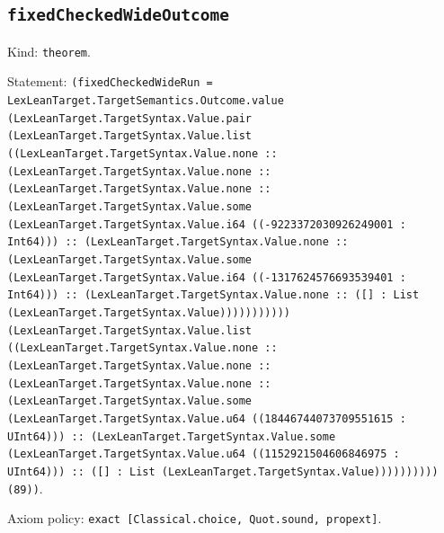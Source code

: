 \documentclass[11pt]{article}
\begin{document}
\subsection*{\texttt{fixedCheckedWideOutcome}}
\noindent Kind: \texttt{theorem}.\par
\noindent Statement: \texttt{(fixedCheckedWideRun = LexLeanTarget.TargetSemantics.Outcome.value (LexLeanTarget.TargetSyntax.Value.pair (LexLeanTarget.TargetSyntax.Value.list ((LexLeanTarget.TargetSyntax.Value.none :: (LexLeanTarget.TargetSyntax.Value.none :: (LexLeanTarget.TargetSyntax.Value.none :: (LexLeanTarget.TargetSyntax.Value.some (LexLeanTarget.TargetSyntax.Value.i64 ((-9223372030926249001 : Int64))) :: (LexLeanTarget.TargetSyntax.Value.none :: (LexLeanTarget.TargetSyntax.Value.some (LexLeanTarget.TargetSyntax.Value.i64 ((-1317624576693539401 : Int64))) :: (LexLeanTarget.TargetSyntax.Value.none :: ([] : List (LexLeanTarget.TargetSyntax.Value))))))))))) (LexLeanTarget.TargetSyntax.Value.list ((LexLeanTarget.TargetSyntax.Value.none :: (LexLeanTarget.TargetSyntax.Value.none :: (LexLeanTarget.TargetSyntax.Value.none :: (LexLeanTarget.TargetSyntax.Value.some (LexLeanTarget.TargetSyntax.Value.u64 ((18446744073709551615 : UInt64))) :: (LexLeanTarget.TargetSyntax.Value.some (LexLeanTarget.TargetSyntax.Value.u64 ((1152921504606846975 : UInt64))) :: ([] : List (LexLeanTarget.TargetSyntax.Value)))))))))) (89))}.\par
\noindent Axiom policy: \texttt{exact [Classical.choice, Quot.sound, propext]}.\par
\end{document}
